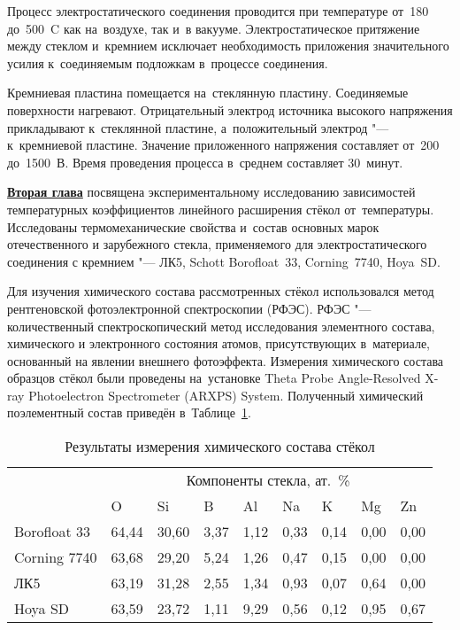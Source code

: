 Процесс электростатического соединения проводится при температуре
от~180 до~500~{\textdegree}C как на~воздухе, так и~в
вакууме.
Электростатическое притяжение между стеклом и~кремнием исключает
необходимость приложения значительного усилия к~соединяемым подложкам
в~процессе соединения.

Кремниевая пластина помещается на~стеклянную пластину. Соединяемые
поверхности нагревают. Отрицательный электрод источника высокого
напряжения  прикладывают к~стеклянной пластине, а~положительный
электрод "--- к~кремниевой пластине. Значение приложенного напряжения
составляет от~200 до~1500~В. Время
проведения процесса в~среднем составляет 30~минут.

\underline{\textbf{Вторая глава}} посвящена экспериментальному
исследованию зависимостей
температурных коэффициентов линейного расширения стёкол
от~температуры. Исследованы
термомеханические свойства и~состав основных марок отечественного
и зарубежного стекла, применяемого для электростатического соединения
с кремнием "--- ЛК5, Schott Borofloat~33, Corning~7740, Hoya~SD.

Для изучения химического состава рассмотренных стёкол использовался
метод рентгеновской фотоэлектронной спектроскопии (РФЭС). РФЭС "---
количественный спектроскопический метод исследования элементного
состава, химического и электронного состояния атомов, присутствующих
в~материале, основанный на явлении внешнего фотоэффекта. Измерения
химического состава образцов стёкол были проведены на~установке Theta
Probe {Angle-Resolved} {X-ray} Photoelectron Spectrometer (ARXPS)
System. Полученный химический поэлементный состав приведён в~Таблице~\ref{syn:tab:results_arxps_glass}.

\setlength\intextsep{1ex}
\begin{table} [!ht]%
    \centering%
   	\caption{Результаты измерения химического состава стёкол}%
   	\label{syn:tab:results_arxps_glass}%
    \begin{tabularx}{\textwidth}{@{}
    >{\raggedright}X
    llllllll@{}}
    \toprule
        \multirow{2}{*}{Марка стекла}
        &
        \multicolumn{8}{c}{Компоненты стекла, ат.~\%} \\
    \cmidrule(l){2-9}
        & O & Si & B & Al & Na & K & Mg & Zn \\
    \midrule
        Borofloat 33 & 64,44 &  30,60 &  3,37 &   1,12 &   0,33 &  0,14 &   0,00 &   0,00 \\
        Corning 7740 & 63,68 &  29,20 &  5,24 &   1,26 &   0,47 &  0,15 &   0,00 &   0,00 \\
        ЛК5 & 63,19 &  31,28 &  2,55 &   1,34 &   0,93 &  0,07 &   0,64 &   0,00 \\
        Hoya SD\nb-2 & 63,59 &  23,72 &  1,11 &   9,29 &   0,56 &  0,12 &   0,95 &   0,67 \\
    \bottomrule %
	\end{tabularx}%
\end{table}

